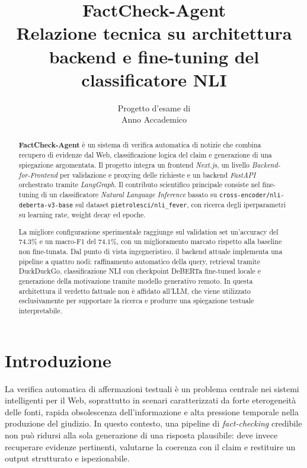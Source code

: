 \documentclass[10pt,a4paper]{article}
\title{\textbf{FactCheck-Agent}\\Relazione tecnica su architettura backend e fine-tuning del classificatore NLI}
\author{\autore}
\date{Progetto d'esame di \insegnamento \\ Anno Accademico \annoademico}
\begin{document}
\maketitle

\begin{abstract}
\noindent
\textbf{FactCheck-Agent} è un sistema di verifica automatica di notizie che combina recupero di evidenze dal Web, classificazione logica del claim e generazione di una spiegazione argomentata. Il progetto integra un frontend \textit{Next.js}, un livello \textit{Backend-for-Frontend} per validazione e proxying delle richieste e un backend \textit{FastAPI} orchestrato tramite \textit{LangGraph}. Il contributo scientifico principale consiste nel fine-tuning di un classificatore \textit{Natural Language Inference} basato su \texttt{cross-encoder/nli-deberta-v3-base} sul dataset \texttt{pietrolesci/nli\_fever}, con ricerca degli iperparametri su learning rate, weight decay ed epoche.

La migliore configurazione sperimentale raggiunge sul validation set un'accuracy del $74.3\%$ e un macro-F1 del $74.1\%$, con un miglioramento marcato rispetto alla baseline non fine-tunata. Dal punto di vista ingegneristico, il backend attuale implementa una pipeline a quattro nodi: raffinamento automatico della query, retrieval tramite DuckDuckGo, classificazione NLI con checkpoint DeBERTa fine-tuned locale e generazione della motivazione tramite modello generativo remoto. In questa architettura il verdetto fattuale non è affidato all'LLM, che viene utilizzato esclusivamente per supportare la ricerca e produrre una spiegazione testuale interpretabile.
\end{abstract}

\section{Introduzione}

La verifica automatica di affermazioni testuali è un problema centrale nei sistemi intelligenti per il Web, soprattutto in scenari caratterizzati da forte eterogeneità delle fonti, rapida obsolescenza dell'informazione e alta pressione temporale nella produzione del giudizio. In questo contesto, una pipeline di \textit{fact-checking} credibile non può ridursi alla sola generazione di una risposta plausibile: deve invece recuperare evidenze pertinenti, valutarne la coerenza con il claim e restituire un output strutturato e ispezionabile.
\end{document}
